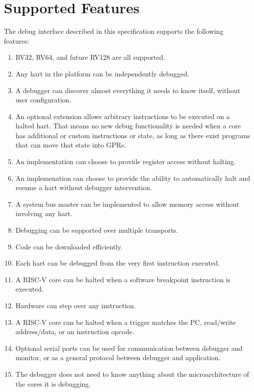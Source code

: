 \documentclass{article}
\begin{document}
\section{Supported Features}
The debug interface described in this specification supports the following features:
\begin{enumerate}
   \item RV32, RV64, and future RV128 are all supported.
   \item Any hart in the platform can be independently debugged.
   \item A debugger can discover almost everything it needs to know itself,
       without user configuration.
   \item An optional extension allows arbitrary instructions to be executed on
       a halted hart. That means no new debug functionality is needed when a
       core has additional or custom instructions or state, as
       long as there exist programs
       that can move that state into GPRs.
   \item An implementation can choose to provide register access without
       halting.
   \item An implemenation can choose to provide the ability to automatically
     halt and resume a hart without debugger intervention.
   \item A system bus master can be implemented to allow memory access without
       involving any hart.
   \item Debugging can be supported over multiple transports.
   \item Code can be downloaded efficiently.
   \item Each hart can be debugged from the very first instruction executed.
   \item A RISC-V core can be halted when a software breakpoint instruction is
       executed.
   \item Hardware can step over any instruction.
   \item A RISC-V core can be halted when a trigger matches the PC, read/write
       address/data, or an instruction opcode.
   \item Optional serial ports can be used for communication between debugger
       and monitor, or as a general protocol between debugger and application.
   \item The debugger does not need to know anything about the microarchitecture
       of the cores it is debugging.
\end{enumerate}
\end{document}
